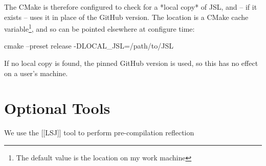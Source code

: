			The CMake is therefore configured to check for a *local copy* of JSL, and -- if it exists -- uses it in place of the GitHub version. The location is a CMake cache variable\footnote{The default value is the location on my work machine}, and so can be pointed elsewhere at configure time:

			\begin{Code}
				cmake --preset release -DLOCAL\_JSL=/path/to/JSL
			\end{Code}

			If no local copy is found, the pinned GitHub version is used, so this has no effect on a user's machine.
\section{Optional Tools}

	We use the [[LSJ]] tool to perform pre-compilation reflection
